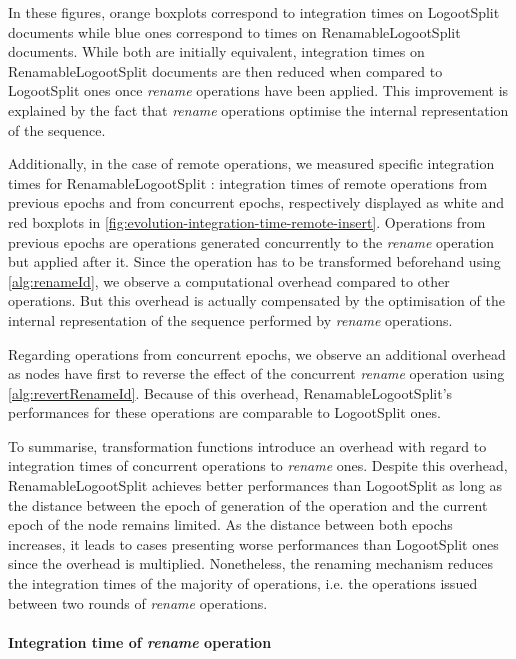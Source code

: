 \documentclass[10pt,journal,compsoc]{IEEEtran}
\newcommand{\ie}{i.e. }
\begin{document}
In these figures, orange boxplots correspond to integration times on LogootSplit documents while blue ones correspond to times on RenamableLogootSplit documents.
While both are initially equivalent, integration times on RenamableLogootSplit documents are then reduced when compared to LogootSplit ones once \emph{rename} operations have been applied.
This improvement is explained by the fact that \emph{rename} operations optimise the internal representation of the sequence.

Additionally, in the case of remote operations, we measured specific integration times for RenamableLogootSplit : integration times of remote operations from previous epochs and from concurrent epochs, respectively displayed as white and red boxplots in \autoref{fig:evolution-integration-time-remote-insert}.
Operations from previous epochs are operations generated concurrently to the \emph{rename} operation but applied after it.
Since the operation has to be transformed beforehand using \autoref{alg:renameId}, we observe a computational overhead compared to other operations.
But this overhead is actually compensated by the optimisation of the internal representation of the sequence performed by \emph{rename} operations.

Regarding operations from concurrent epochs, we observe an additional overhead as nodes have first to reverse the effect of the concurrent \emph{rename} operation using \autoref{alg:revertRenameId}.
Because of this overhead, RenamableLogootSplit's performances for these operations are comparable to LogootSplit ones.

To summarise, transformation functions introduce an overhead with regard to integration times of concurrent operations to \emph{rename} ones.
Despite this overhead, RenamableLogootSplit achieves better performances than LogootSplit as long as the distance between the epoch of generation of the operation and the current epoch of the node remains limited.
As the distance between both epochs increases, it leads to cases presenting worse performances than LogootSplit ones since the overhead is multiplied.
Nonetheless, the renaming mechanism reduces the integration times of the majority of operations, \ie the operations issued between two rounds of \emph{rename} operations.

\paragraph{Integration time of \emph{rename} operation}
\end{document}
